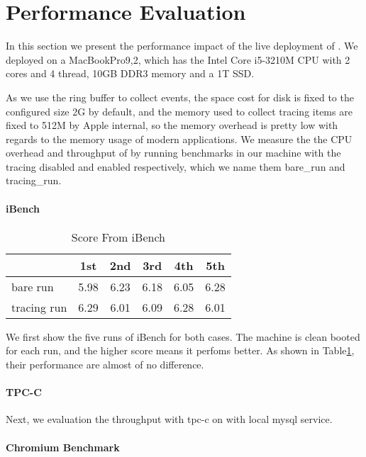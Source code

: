 \section{Performance Evaluation}\label{sec:evaluation}

In this section we present the performance impact of the live deployment of
\xxx. We deployed \xxx on a MacBookPro9,2, which has the Intel Core i5-3210M CPU
with 2 cores and 4 thread, 10GB DDR3 memory and a 1T SSD.


As we use the ring buffer to collect events, the space cost for disk is fixed
to the configured size 2G by default, and the memory used to collect tracing
items are fixed to 512M by Apple internal, so the memory overhead is pretty low
with regards to the memory usage of modern applications. We measure the the CPU
overhead and throughput of \xxx by running benchmarks in our machine with the
tracing disabled and enabled respectively, which we name them bare\_run and
tracing\_run.

\paragraph{iBench}
\begin{table}[ht]
\begin{tabular}{l|c|c|c|c|c}
\hline
 & 1st & 2nd & 3rd & 4th & 5th\\
\hline
 bare run & 5.98 & 6.23 & 6.18 & 6.05 & 6.28\\
\hline
 tracing run& 6.29 & 6.01 & 6.09 & 6.28 & 6.01\\
\hline
\end{tabular}
\caption{Score From iBench}
\label{tab:ibench}
\end{table}

We first show the five runs of iBench for both cases. The machine is clean
booted for each run, and the higher score means it perfoms better. As shown in
Table\ref{tab:ibench}, their performance are almost of no difference.

\paragraph{TPC-C}
Next, we evaluation the throughput with tpc-c on \xxx with local mysql service.

\paragraph{Chromium Benchmark}

